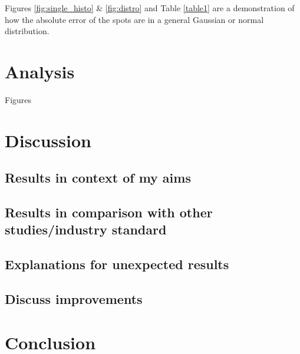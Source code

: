 \documentclass[aps,pra,a4paper,nofootinbib,onecolumn,tightenlines,longbibliography,12pt,amsfonts,amssymb,amsmath,floatfix]{revtex4-2} %
\begin{document}
Figures \ref{fig:single_histo} \& \ref{fig:distro} and Table \ref{table1} are a demonstration of how the absolute
error of the spots are in a general Gaussian or normal distribution. 
  
  
      
\section{Analysis}
\label{sec:Analysis}

Figures 

\section{Discussion} %
\label{sec:Discussion}


  \subsection{Results in context of my aims} %
  \label{sub:Results in context of my aims}

  \subsection{Results in comparison with other studies/industry standard} %
  \label{sub:Results in comparison with other studies/industry standard}
  
  \subsection{Explanations for unexpected results} %
  \label{sub:Explanations for unexpected results}
  
  \subsection{Discuss improvements} %
  \label{sub:Discuss improvement}



\section{Conclusion} %
\label{sec:Conclusion}






\end{document}
